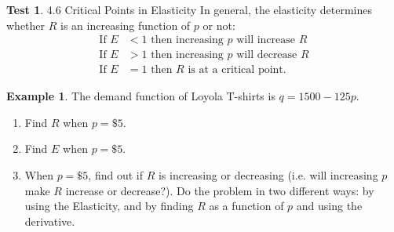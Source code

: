 \documentclass[oneside]{book}
\theoremstyle{definition}
\newtheorem{example}{Example}
\newtheorem{test}[definition]{Test}
\theoremstyle{solution}
\begin{document}
\begin{test}{4.6 Critical Points in Elasticity}
In general, the elasticity determines whether $R$ is an increasing
function of $p$ or not:
$$
\boxed{
\begin{aligned}
\text{If } E & < 1 \text{ then increasing $p$ will increase $R$}\\
\text{If } E & > 1 \text{ then increasing $p$ will decrease $R$}\\
\text{If } E & = 1 \text{ then $R$ is at a critical point.}
\end{aligned}
}
$$
\end{test}

   

\begin{example}
 The demand function of Loyola T-shirts is $q = 1500 - 125p$.
 \begin{enumerate}
 \item Find $R$ when $p = \$5$.
 \item Find $E$ when $p = \$5$.
 \item When $p = \$5$, find out if $R$ is increasing or decreasing
   (i.e. will increasing $p$ make $R$ increase or decrease?). Do the
   problem in two different ways: by using the Elasticity, and by
   finding $R$ as a function of $p$ and using the derivative.
 \end{enumerate}
\end{example}
\end{document}
